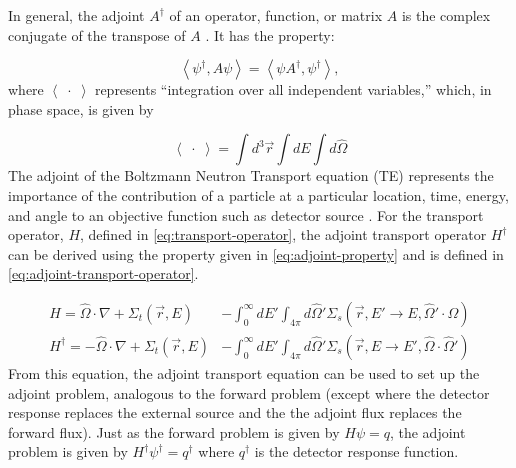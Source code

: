 \documentclass[10pt]{article}
\begin{document}
In general, the adjoint $A^\dagger$ of an operator, function, or matrix $A$ is the complex conjugate of the transpose of $A$ \cite{boas}.
It has the property:

\begin{equation}
\left< \psi^\dagger, A \psi \right> =
\left< \psi A^\dagger, \psi^\dagger \right>
,
\label{eq:adjoint-property}
\end{equation}
where $\left< \;\cdot\; \right>$ represents ``integration over all independent variables,'' which, in phase space, is given by \cite{lewis-and-miller}

\begin{equation*}
\left< \;\cdot\; \right> = \int d^3\vec{r} \int dE \int d\hat{\Omega}
\end{equation*}
%
The adjoint of the Boltzmann Neutron Transport equation (TE) represents the importance of the contribution of a particle at a particular location, time, energy, and angle to an objective function such as detector source \cite{wagner:automated-variance-reduction}.
For the transport operator, $H$, defined in \cref{eq:transport-operator}, the adjoint transport operator $H^\dagger$ can be derived using the property given in \cref{eq:adjoint-property} and is defined in \cref{eq:adjoint-transport-operator}.

\begin{subequations}
\begin{align}
H =
\hat{\Omega} \cdot \nabla
+ \Sigma_t(\vec{r}, E)
&
- \int_0^\infty dE'
\int_{4\pi} d\hat{\Omega}'
\Sigma_s(
\vec{r},
E' \rightarrow E,
\hat{\Omega}' \cdot \hat{\Omega})
\label{eq:transport-operator}
\\
H^\dagger =
- \hat{\Omega} \cdot \nabla
+ \Sigma_t(\vec{r}, E)
&
- \int_0^\infty dE'
\int_{4\pi} d\hat{\Omega}'
\Sigma_s(
\vec{r},
E \rightarrow E',
\hat{\Omega} \cdot \hat{\Omega}')
\label{eq:adjoint-transport-operator}
\end{align}
\end{subequations}
From this equation, the adjoint transport equation can be used to set up the adjoint problem, analogous to the forward problem (except where the detector response replaces the external source and the the adjoint flux replaces the forward flux). Just as the forward problem is given by $H\psi = q$, the adjoint problem is given by $H^{\dagger}\psi^{\dagger} = q^{\dagger}$ where $q^{\dagger}$ is the detector response function. 
\end{document}
